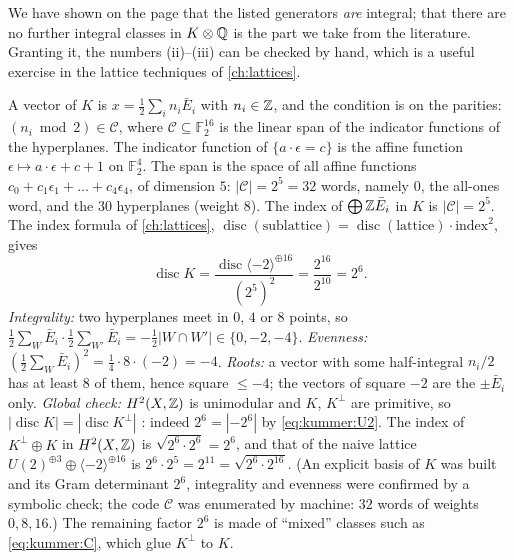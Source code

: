 We have shown on the page that the listed generators \emph{are} integral; that there are no
further integral classes in $K\otimes\mathbb{Q}$ is the part we take from the literature. Granting
it, the numbers (ii)--(iii) can be checked by hand, which is a useful exercise in the lattice
techniques of \cref{ch:lattices}.

\begin{example}\label{ex:kummer:index}
A vector of $K$ is $x=\frac12\sum_in_i\bar E_i$ with $n_i\in\mathbb{Z}$, and the condition is on the
parities: $(n_i\bmod2)\in\mathcal{C}$, where $\mathcal{C}\subseteq\mathbb{F}_2^{16}$ is the
linear span of the indicator functions of the hyperplanes. The indicator function of
$\{a\cdot\epsilon=c\}$ is the affine function $\epsilon\mapsto a\cdot\epsilon+c+1$ on
$\mathbb{F}_2^4$. The span is the space of all affine functions
$c_0+c_1\epsilon_1+\dots+c_4\epsilon_4$, of dimension $5$: $|\mathcal{C}|=2^5=32$ words,
namely $0$, the all-ones word, and the $30$ hyperplanes (weight $8$). The index of
$\bigoplus\mathbb{Z}\bar E_i$ in $K$ is $|\mathcal{C}|=2^5$. The index formula of \cref{ch:lattices},
$\operatorname{disc}(\text{sublattice})=\operatorname{disc}(\text{lattice})\cdot
\text{index}^2$, gives
\[
  \operatorname{disc}K=\frac{\operatorname{disc}\langle-2\rangle^{\oplus16}}{(2^5)^2}
  =\frac{2^{16}}{2^{10}}=2^6 .
\]
\emph{Integrality:} two hyperplanes meet in $0$, $4$ or $8$ points, so
$\frac12\sum_W\bar E_i\cdot\frac12\sum_{W'}\bar E_i=-\frac12|W\cap W'|\in\{0,-2,-4\}$.
\emph{Evenness:} $(\frac12\sum_W\bar E_i)^2=\frac14\cdot8\cdot(-2)=-4$. \emph{Roots:} a vector
with some half-integral $n_i/2$ has at least $8$ of them, hence square $\le-4$; the vectors
of square $-2$ are the $\pm\bar E_i$ only. \emph{Global check:} $H^2(X,\mathbb{Z})$ is unimodular
and $K$, $K^\perp$ are primitive, so $|\operatorname{disc}K|=|\operatorname{disc}K^\perp|$
: indeed $2^6=|-2^6|$ by \eqref{eq:kummer:U2}. The index of
$K^\perp\oplus K$ in $H^2(X,\mathbb{Z})$ is $\sqrt{2^6\cdot2^6}=2^6$, and that of the naive lattice
$U(2)^{\oplus3}\oplus\langle-2\rangle^{\oplus16}$ is $2^6\cdot2^5=2^{11}
=\sqrt{2^6\cdot2^{16}}$. (An explicit basis of $K$ was built and its Gram determinant $2^6$,
integrality and evenness were confirmed by a symbolic check; the code $\mathcal{C}$ was
enumerated by machine: $32$ words of weights $0,8,16$.) The remaining factor $2^6$ is made of
``mixed'' classes such as \eqref{eq:kummer:C}, which glue $K^\perp$ to $K$.
\end{example}

